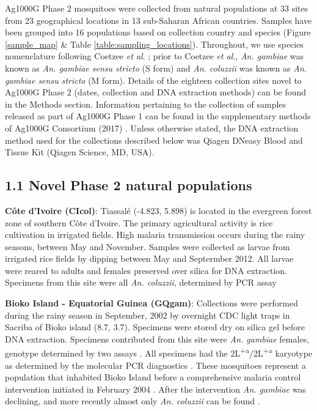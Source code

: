 \documentclass[a4paper,11pt,abstracton,hidelinks]{scrartcl}
\begin{document}
%
Ag1000G Phase 2 mosquitoes were collected from natural populations at 33 sites from 23
geographical locations in 13 sub-Saharan African countries. 
%
Samples have been grouped into 16 populations based on collection country and species (Figure \ref{sample_map} \& Table \ref{table:sampling_locations}).
%
Throughout, we use species nomenclature following Coetzee \textit{et al}. \cite{coetzee2013};	
%
prior to	 Coetzee	 \textit{et al}., \textit{An. gambiae} was known as \textit{An. gambiae sensu stricto} (S form) and \textit{An. coluzzii} was known as \textit{An. gambiae sensu stricto} (M form).
%
Details of the eighteen collection sites novel to Ag1000G Phase 2 (dates, collection and DNA extraction methods) can be found in the Methods section.
%
Information pertaining to the collection of samples released as part of Ag1000G Phase 1 can be found in the supplementary methods of Ag1000G Consortium (2017) \cite{Ag1000gConsortium2017}.
%
Unless otherwise stated, the DNA extraction method used for the collections described below was Qiagen DNeasy Blood and Tissue Kit (Qiagen Science, MD, USA).

\subsection*{1.1 Novel Phase 2 natural populations}
%
\textbf{C\^{o}te d'Ivoire (CIcol)}: Tiassal\'{e} (-4.823, 5.898) is located in the evergreen forest zone of southern C\^{o}te d'Ivoire.
%
The primary agricultural activity is rice cultivation in irrigated fields.
%
High malaria transmission occurs during the rainy seasons, between May and November.
%
Samples were collected as larvae from irrigated rice fields by dipping between May and Septermber 2012.
%
All larvae were reared to adults and females preserved over silica for DNA extraction.
%
Specimens from this site were all \textit{An. coluzzii}, determined by PCR assay \cite{santolamazza2008}

\textbf{Bioko Island - Equatorial Guinea (GQgam)}: Collections were performed during the rainy season in September, 2002 by overnight CDC light traps in Sacriba of Bioko island (8.7, 3.7).
%
Specimens were stored dry on silica gel before DNA extraction.
%
Specimens contributed from this site were \textit{An. gambiae} females, genotype determined by two assays \cite{scott1993, santolamazza2004}.
%
All specimens had the 2L\textsuperscript{+a}/2L\textsuperscript{+a} karyotype as determined by the molecular PCR diagnostics \cite{White2007}. 
%
These mosquitoes represent a population that inhabited Bioko Island before a comprehensive malaria control intervention initiated in February 2004 \cite{Sharp2007}. 
%
After the intervention \textit{An. gambiae} was declining, and more recently almost only \textit{An. coluzzii} can be found \cite{Overgaard2012}.
\end{document}
